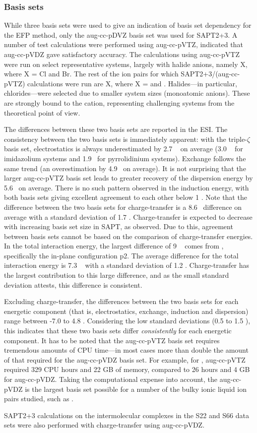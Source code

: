 \subsubsection{Basis sets}
While three basis sets were used to give an indication of basis set dependency for the EFP method, only the aug-cc-pDVZ basis set was used for SAPT2+3. 
A number of test calculations were performed using aug-cc-pVTZ, indicated that aug-cc-pVDZ gave satisfactory accuracy.
The calculations using aug-cc-pVTZ were run on select representative systems, largely with halide anions, namely X, where X = Cl and Br.
The rest of the ion pairs for which SAPT2+3/(aug-cc-pVTZ) calculations were run are X, where X = \bfl and \cl.
Halides---in particular, chlorides---were selected due to smaller system sizes (monoatomic anions). 
These are strongly bound to the cation, representing challenging systems from the theoretical point of view.
\cite{Lehmann2010a}


The differences between these two basis sets are reported in the ESI.
The consistency between the two basis sets is immediately apparent: with the triple-$\zeta$ basis set, electrostatics is always underestimated by 2.7 \enUnit~ on average (3.0 \enUnit~ for imidazolium systems and 1.9 \enUnit~for pyrrolidinium systems). 
Exchange follows the same trend (an overestimation by 4.9 \enUnit~on average).
It is not surprising that the larger aug-cc-pVTZ basis set leads to greater recovery of the dispersion energy by 5.6 \enUnit~on average.
There is no such pattern observed in the induction energy, with both basis sets giving excellent agreement to each other below 1 \enUnit.
Note that the difference between the two basis sets for charge-transfer is a 8.6 \enUnit~difference on average with a standard deviation of 1.7 \enUnit.
Charge-transfer is expected to decrease with increasing basis set size in SAPT, as observed. 
Due to this, agreement between basis sets cannot be based on the comparison of charge-transfer energies.
In the total interaction energy, the largest difference of 9 \enUnit~ comes from , specifically the in-plane configuration p2.
The average difference for the total interaction energy is 7.3 \enUnit~ with a standard deviation of 1.2 \enUnit.
Charge-transfer has the largest contribution to this large difference, and as the small standard deviation attests, this difference is consistent.

Excluding charge-transfer, the differences between the two basis sets for each energetic component (that is, electrostatics, exchange, induction and dispersion) range between -7.0 to 4.8 \enUnit.
Considering the low standard deviations  (0.5 to 1.5 \enUnit), this indicates that these two basis sets differ \emph{consistently} for each energetic component. 
It has to be noted that the aug-cc-pVTZ basis set requires tremendous amounts of CPU time---in most cases more than double the amount of that required for the aug-cc-pVDZ basis set.
For example, for , aug-cc-pVTZ required 329 CPU hours and 22 GB of memory, compared to 26  hours and 4 GB for aug-cc-pVDZ. Taking the computational expense into account, the aug-cc-pVDZ is the largest basis set possible for a number of the bulky ionic liquid ion pairs studied, such as .

SAPT2+3 calculations on the intermolecular complexes in the S22 and S66 data sets were also performed with charge-transfer using aug-cc-pVDZ.
\cite{Jurecka2006a, Takatani2010a, Rezac2011a}
